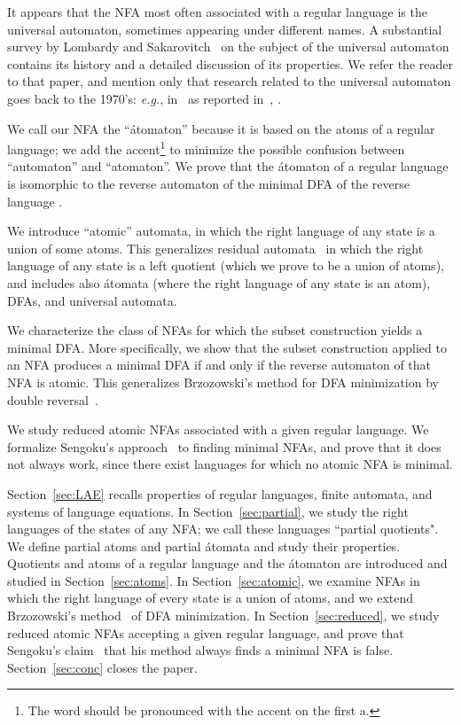 \documentclass[preprint,12pt]{elsarticle}
\newcommand{\eg}{\mbox{\it e.g.}}
\begin{document}
It appears that the NFA most often associated with a regular language is 
the universal automaton, sometimes  appearing under different names. 
A substantial survey by Lombardy and Sakarovitch~\cite{LoSa07} on the subject 
of the universal automaton contains its history and a detailed discussion 
of its properties. We refer the reader to that paper, and mention only that 
research related to the universal automaton goes back to the 
1970's: \eg, in~\cite{Car70} as reported in~\cite{ADN92}, \cite{Con71,KaWe70}.

We call our NFA the ``\'atomaton'' because it is based on the atoms of a regular language; 
we add the accent\footnote{The word should be pronounced with 
the accent on the first a.} to minimize the possible confusion between ``automaton'' and ``atomaton''.
We prove that the \'atomaton of a regular language  is isomorphic to the reverse 
automaton of the minimal DFA of the reverse language .

We  introduce ``atomic'' automata, in which the right language of any state is 
a union of some atoms. 
This generalizes residual automata~\cite{DLT02} 
in which the right language of any state is a left quotient (which we prove 
to be a union of atoms), and includes also  \'atomata (where the right language 
of any state is an atom), DFAs, and universal automata.

We characterize the class of NFAs for which the subset construction 
yields a minimal DFA. More specifically, we show that the subset construction 
applied to an NFA produces a minimal DFA if and only if the reverse automaton 
of that NFA is atomic. 
This generalizes Brzozowski's method for DFA minimization by double reversal~\cite{Brz63}.

We study reduced atomic NFAs associated with a given regular language. We formalize Sengoku's approach~\cite{Sen92} to finding minimal NFAs, and prove that it does not always work, since there exist languages for which no atomic NFA is minimal.

Section~\ref{sec:LAE} recalls properties of regular languages, finite automata, and systems of language equations.
In Section~\ref{sec:partial}, we study the right languages of the states of any NFA; we call these languages ``partial quotients". We define partial atoms and partial \'atomata and study their properties.
Quotients and atoms of a regular language and the \'atomaton are introduced and 
studied in Section~\ref{sec:atoms}.
In Section~\ref{sec:atomic}, we examine NFAs in which the right language of every state is a union of atoms, and we extend
Brzozowski's method~\cite{Brz63} of DFA minimization.
In Section~\ref{sec:reduced}, we study reduced atomic NFAs accepting a given regular language, and prove that Sengoku's claim~\cite{Sen92} that his method always finds a minimal NFA is false.
Section~\ref{sec:conc} closes the paper.
\end{document}
